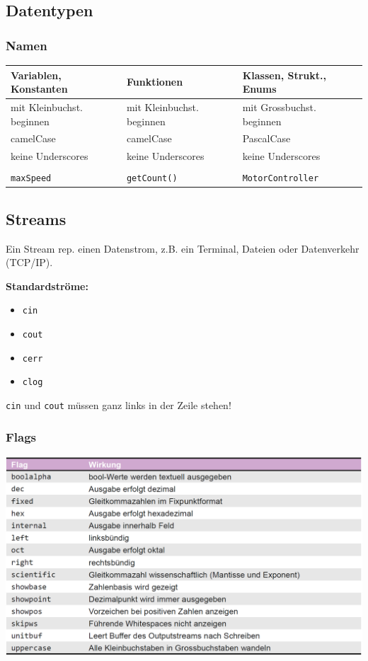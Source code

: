     \subsection{Datentypen}

        \subsubsection{Namen}
            \begin{tabular}{|l|l|l|}
                \hline
                Variablen, Konstanten & Funktionen & Klassen, Strukt., Enums \\
                \hline
                mit Kleinbuchst. beginnen & mit Kleinbuchst. beginnen & mit Grossbuchst. beginnen \\
                camelCase & camelCase & PascalCase \\
                keine Underscores & keine Underscores & keine Underscores \\
                &&\\
                \verb|maxSpeed| & \verb|getCount()| & \verb|MotorController| \\
                \hline
            \end{tabular}

    \subsection{Streams}
        Ein Stream rep. einen Datenstrom, z.B. ein Terminal, Dateien oder Datenverkehr (TCP/IP).

        \textbf{Standardströme:}
        \begin{itemize}
            \item \verb|cin|
            \item \verb|cout|
            \item \verb|cerr|
            \item \verb|clog|
        \end{itemize}

        \verb|cin| und \verb|cout| müssen ganz links in der Zeile stehen!

        \subsubsection{Flags}
            \includegraphics[width=0.95\linewidth]{Bilder/cpp_flags-iostream.png}


